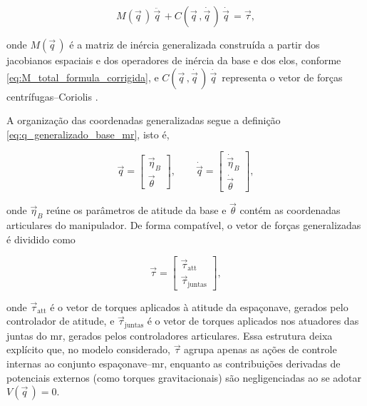 \begin{equation}
M(\vec q\,)\,\ddot{\vec q\,}
+
C(\vec q\,,\dot{\vec q\,})\,\dot{\vec q\,}
=
\vec\tau,
\label{eq:dinamica_geral}
\end{equation}

onde $M(\vec q\,)$ é a matriz de inércia generalizada construída a partir
dos jacobianos espaciais e dos operadores de inércia da base e dos elos,
conforme \eqref{eq:M_total_formula_corrigida}, e
$C(\vec q\,,\dot{\vec q\,})\,\dot{\vec q\,}$ representa o vetor de
forças centrífugas--Coriolis \cite{featherstone2008,lynch2017modern}.

A organização das coordenadas generalizadas segue a definição
\eqref{eq:q_generalizado_base_mr}, isto é,

\begin{equation}
\vec q
=
\begin{bmatrix}
\vec\eta_B \\
\vec\theta
\end{bmatrix},
\qquad
\dot{\vec q}
=
\begin{bmatrix}
\dot{\vec\eta}_B \\
\dot{\vec\theta}
\end{bmatrix},
\end{equation}

onde $\vec\eta_B$ reúne os parâmetros de atitude da base e $\vec\theta$
contém as coordenadas articulares do manipulador.
De forma compatível, o vetor de forças generalizadas é dividido como

\begin{equation}
\vec\tau
=
\begin{bmatrix}
\vec\tau_{\text{att}} \\
\vec\tau_{\text{juntas}}
\end{bmatrix},
\label{eq:tau_estruturado_final}
\end{equation}

onde $\vec\tau_{\text{att}}$ é o vetor de torques aplicados à atitude da
espaçonave, gerados pelo controlador de atitude, e
$\vec\tau_{\text{juntas}}$ é o vetor de torques aplicados nos atuadores
das juntas do \gls{mr}, gerados pelos controladores articulares.
Essa estrutura deixa explícito que, no modelo considerado, $\vec\tau$
agrupa apenas as ações de controle internas ao conjunto
espaçonave--\gls{mr}, enquanto as contribuições derivadas de potenciais
externos (como torques gravitacionais) são negligenciadas ao se adotar
$V(\vec q\,) = 0$.


